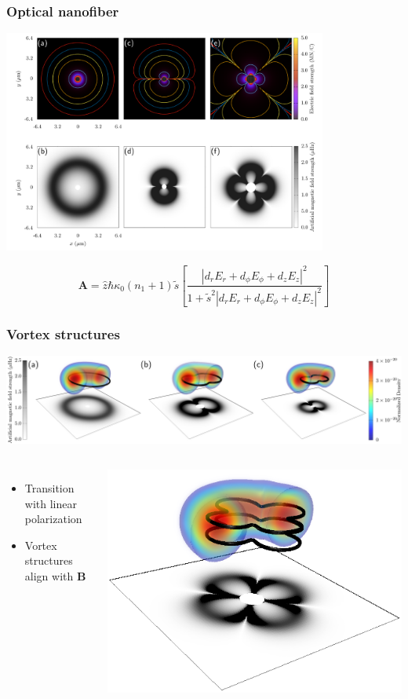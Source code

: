 \documentclass{beamer}
\begin{document}
\begin{frame}
\frametitle{Optical nanofiber}
\center \includegraphics[width=0.8\textwidth]{../data/3d/all_fields.pdf}

$$
\mathbf{A} = \hat{z} \hbar \kappa_0 (n_1 + 1) \tilde{s} \left[\frac{|d_rE_r + d_{\phi}E_{\phi} + d_zE_z|^2}{1 + \tilde s^2|d_rE_r + d_{\phi}E_{\phi} + d_zE_z|^2} \right]
$$
\end{frame}

\begin{frame}
\frametitle{Vortex structures}
\includegraphics[width=\textwidth]{../data/3d/vortex_transition.png}
\begin{columns}
\begin{itemize}
\item Transition with linear polarization
\item Vortex structures align with $\mathbf{B}$
\end{itemize}
\center \includegraphics[width=\linewidth]{../data/3d/HE21_3d.png}
\end{columns}
\end{frame}
\end{document}
